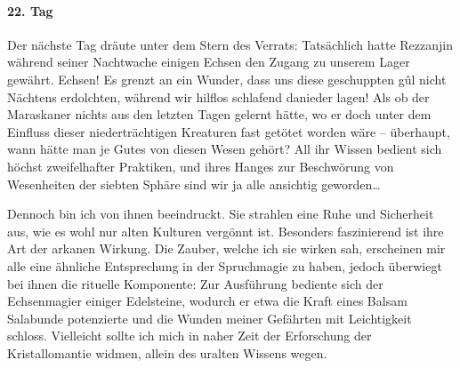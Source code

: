 \paragraph{22. Tag}
Der nächste Tag dräute unter dem Stern des Verrats: Tatsächlich hatte Rezzanjin während seiner Nachtwache einigen Echsen den Zugang zu unserem Lager gewährt. Echsen! Es grenzt an ein Wunder, dass uns diese geschuppten gûl nicht Nächtens erdolchten, während wir hilflos schlafend danieder lagen! Als ob der Maraskaner nichts aus den letzten Tagen gelernt hätte, wo er doch unter dem Einfluss dieser niederträchtigen Kreaturen fast getötet worden wäre -- überhaupt, wann hätte man je Gutes von diesen Wesen gehört? All ihr Wissen bedient sich höchst zweifelhafter Praktiken, und ihres Hanges zur Beschwörung von Wesenheiten der siebten Sphäre sind wir ja alle ansichtig geworden\dots

Dennoch bin ich von ihnen beeindruckt. Sie strahlen eine Ruhe und Sicherheit aus, wie es wohl nur alten Kulturen vergönnt ist. Besonders faszinierend ist ihre Art der arkanen Wirkung. Die Zauber, welche ich sie wirken sah, erscheinen mir alle eine ähnliche Entsprechung in der Spruchmagie zu haben, jedoch überwiegt bei ihnen die rituelle Komponente: Zur Ausführung bediente sich der Echsenmagier einiger Edelsteine, wodurch er etwa die Kraft eines Balsam Salabunde potenzierte und die Wunden meiner Gefährten mit Leichtigkeit schloss. Vielleicht sollte ich mich in naher Zeit der Erforschung der Kristallomantie widmen, allein des uralten Wissens wegen.

